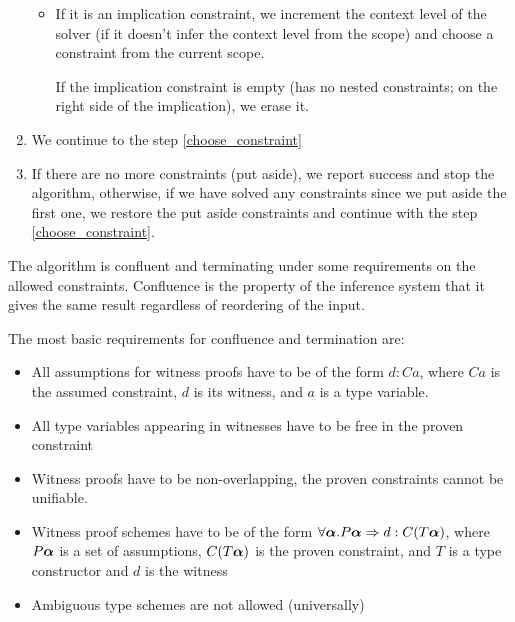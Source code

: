 \begin{defn}
\begin{enumerate}
\begin{itemize}
            \item If it is an implication constraint, we increment the context level of the solver (if it doesn't infer the context level from the scope) and choose a constraint from the current scope.

            If the implication constraint is empty (has no nested constraints; on the right side of the implication), we erase it.
        \end{itemize}

        \item We continue to the step \ref{choose_constraint}

        \item \label{false_constraint} If there are no more constraints (put aside), we report success and stop the algorithm, otherwise, if we have solved any constraints since we put aside the first one, we restore the put aside constraints and continue with the step \ref{choose_constraint}.
    \end{enumerate}
\end{defn}

The algorithm is confluent and terminating  under some requirements on the allowed constraints. Confluence is the property of the inference system that it gives the same result regardless of reordering of the input.

The most basic requirements for confluence and termination are:


\begin{itemize}
    \item All assumptions for witness proofs have to be of the form $d : C a$, where $C a$ is the assumed constraint, $d$ is its witness, and $a$ is a type variable. \label{triv_assump}
    \item All type variables appearing in witnesses have to be free in the proven constraint \label{free_free}
    \item Witness proofs have to be non-overlapping, the proven constraints cannot be unifiable. \label{noover}
    \item Witness proof schemes have to be of the form $\forall \boldsymbol{\alpha} . P \boldsymbol{\alpha} \Rightarrow d : C (T \boldsymbol{\alpha})$, where $P \boldsymbol{\alpha}$ is a set of assumptions, $C (T \boldsymbol{\alpha})$ is the proven constraint, and $T$ is a type constructor and $d$ is the witness \label{lookup_t}
    \item Ambiguous type schemes are not allowed (universally)
\end{itemize}

